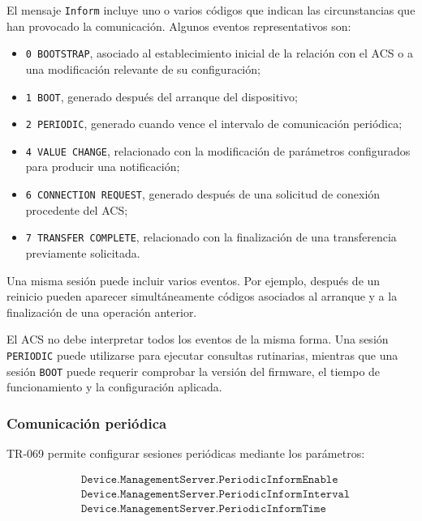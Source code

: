 El mensaje \texttt{Inform} incluye uno o varios códigos que indican las
circunstancias que han provocado la comunicación. Algunos eventos
representativos son:

\begin{itemize}
    \item \texttt{0 BOOTSTRAP}, asociado al establecimiento inicial de
    la relación con el ACS o a una modificación relevante de su
    configuración;

    \item \texttt{1 BOOT}, generado después del arranque del
    dispositivo;

    \item \texttt{2 PERIODIC}, generado cuando vence el intervalo de
    comunicación periódica;

    \item \texttt{4 VALUE CHANGE}, relacionado con la modificación de
    parámetros configurados para producir una notificación;

    \item \texttt{6 CONNECTION REQUEST}, generado después de una
    solicitud de conexión procedente del ACS;

    \item \texttt{7 TRANSFER COMPLETE}, relacionado con la finalización
    de una transferencia previamente solicitada.
\end{itemize}

Una misma sesión puede incluir varios eventos. Por ejemplo, después de un
reinicio pueden aparecer simultáneamente códigos asociados al arranque y
a la finalización de una operación anterior.

El ACS no debe interpretar todos los eventos de la misma forma. Una sesión
\texttt{PERIODIC} puede utilizarse para ejecutar consultas rutinarias,
mientras que una sesión \texttt{BOOT} puede requerir comprobar la versión
del firmware, el tiempo de funcionamiento y la configuración aplicada.


\subsubsection*{Comunicación periódica}

TR-069 permite configurar sesiones periódicas mediante los parámetros:

\[
\begin{aligned}
    &\texttt{Device.ManagementServer.PeriodicInformEnable}\\
    &\texttt{Device.ManagementServer.PeriodicInformInterval}\\
    &\texttt{Device.ManagementServer.PeriodicInformTime}
\end{aligned}
\]

